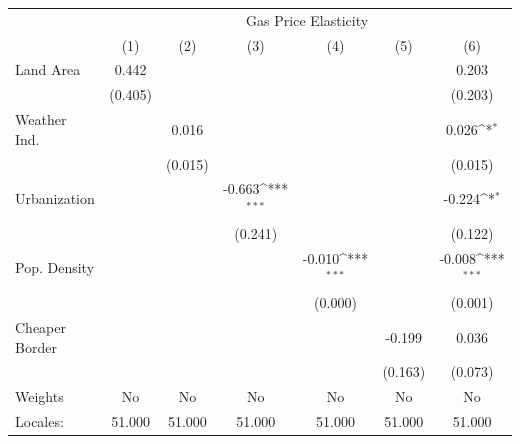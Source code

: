 {
\def\sym#1{\ifmmode^{#1}\else\(^{#1}\)\fi}
\begin{tabular}{l*{6}{c}}
\hline\hline
            &\multicolumn{6}{c}{Gas Price Elasticity}                                                                                           \\
            &\multicolumn{1}{c}{(1)}         &\multicolumn{1}{c}{(2)}         &\multicolumn{1}{c}{(3)}         &\multicolumn{1}{c}{(4)}         &\multicolumn{1}{c}{(5)}         &\multicolumn{1}{c}{(6)}         \\
\hline
Land Area   &       0.442         &                     &                     &                     &                     &       0.203         \\
            &     (0.405)         &                     &                     &                     &                     &     (0.203)         \\
[1em]
Weather Ind.&                     &       0.016         &                     &                     &                     &       0.026\sym{*}  \\
            &                     &     (0.015)         &                     &                     &                     &     (0.015)         \\
[1em]
Urbanization&                     &                     &      -0.663\sym{***}&                     &                     &      -0.224\sym{*}  \\
            &                     &                     &     (0.241)         &                     &                     &     (0.122)         \\
[1em]
Pop. Density&                     &                     &                     &      -0.010\sym{***}&                     &      -0.008\sym{***}\\
            &                     &                     &                     &     (0.000)         &                     &     (0.001)         \\
[1em]
Cheaper Border&                     &                     &                     &                     &      -0.199         &       0.036         \\
            &                     &                     &                     &                     &     (0.163)         &     (0.073)         \\
\hline
Weights     &          No         &          No         &          No         &          No         &          No         &          No         \\
Locales:    &      51.000         &      51.000         &      51.000         &      51.000         &      51.000         &      51.000         \\
\hline\hline
\end{tabular}
}
